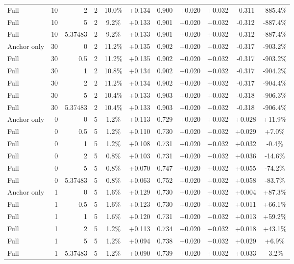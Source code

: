 \begin{table}[htbp]
\begin{tabular}{lrrrccccccc}
Full & 10 & 2 & 2 & 10.0\% & +0.134 & 0.900 & +0.020 & +0.032 & -0.311 & -885.4\% \\
Full & 10 & 5 & 2 & 9.2\% & +0.133 & 0.901 & +0.020 & +0.032 & -0.312 & -887.4\% \\
Full & 10 & 5.37483 & 2 & 9.2\% & +0.133 & 0.901 & +0.020 & +0.032 & -0.312 & -887.4\% \\
Anchor only & 30 & 0 & 2 & 11.2\% & +0.135 & 0.902 & +0.020 & +0.032 & -0.317 & -903.2\% \\
Full & 30 & 0.5 & 2 & 11.2\% & +0.135 & 0.902 & +0.020 & +0.032 & -0.317 & -903.2\% \\
Full & 30 & 1 & 2 & 10.8\% & +0.134 & 0.902 & +0.020 & +0.032 & -0.317 & -904.2\% \\
Full & 30 & 2 & 2 & 11.2\% & +0.134 & 0.902 & +0.020 & +0.032 & -0.317 & -904.4\% \\
Full & 30 & 5 & 2 & 10.4\% & +0.133 & 0.903 & +0.020 & +0.032 & -0.318 & -906.3\% \\
Full & 30 & 5.37483 & 2 & 10.4\% & +0.133 & 0.903 & +0.020 & +0.032 & -0.318 & -906.4\% \\
Anchor only & 0 & 0 & 5 & 1.2\% & +0.113 & 0.729 & +0.020 & +0.032 & +0.028 & +11.9\% \\
Full & 0 & 0.5 & 5 & 1.2\% & +0.110 & 0.730 & +0.020 & +0.032 & +0.029 & +7.0\% \\
Full & 0 & 1 & 5 & 1.2\% & +0.108 & 0.731 & +0.020 & +0.032 & +0.032 & -0.4\% \\
Full & 0 & 2 & 5 & 0.8\% & +0.103 & 0.731 & +0.020 & +0.032 & +0.036 & -14.6\% \\
Full & 0 & 5 & 5 & 0.8\% & +0.070 & 0.747 & +0.020 & +0.032 & +0.055 & -74.2\% \\
Full & 0 & 5.37483 & 5 & 0.8\% & +0.063 & 0.752 & +0.020 & +0.032 & +0.058 & -83.7\% \\
Anchor only & 1 & 0 & 5 & 1.6\% & +0.129 & 0.730 & +0.020 & +0.032 & +0.004 & +87.3\% \\
Full & 1 & 0.5 & 5 & 1.6\% & +0.123 & 0.730 & +0.020 & +0.032 & +0.011 & +66.1\% \\
Full & 1 & 1 & 5 & 1.6\% & +0.120 & 0.731 & +0.020 & +0.032 & +0.013 & +59.2\% \\
Full & 1 & 2 & 5 & 1.2\% & +0.113 & 0.734 & +0.020 & +0.032 & +0.018 & +43.1\% \\
Full & 1 & 5 & 5 & 1.2\% & +0.094 & 0.738 & +0.020 & +0.032 & +0.029 & +6.9\% \\
Full & 1 & 5.37483 & 5 & 1.2\% & +0.090 & 0.739 & +0.020 & +0.032 & +0.033 & -3.2\% \\

\end{tabular}
\end{table}
